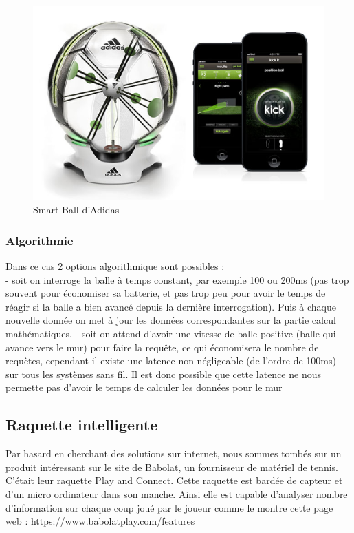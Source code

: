 \begin{figure}[h]
\begin{center}
\includegraphics[width=\textwidth]{ballefootintelligente.png}
\caption{Smart Ball d'Adidas}
\label{img:ballefootintelligente}
\end{center}
\end{figure}

\subsubsection{Algorithmie}

Dans ce cas 2 options algorithmique sont possibles : \\
- soit on interroge la balle à temps constant, par exemple 100 ou 200ms (pas trop souvent pour économiser sa batterie, et pas trop peu pour avoir le temps de réagir si la balle a bien avancé depuis la dernière interrogation). Puis à chaque nouvelle donnée on met à jour les données correspondantes sur la partie calcul mathématiques.
- soit on attend d'avoir une vitesse de balle positive (balle qui avance vers le mur) pour faire la requête, ce qui économisera le nombre de requètes, cependant il existe une latence non négligeable (de l'ordre de 100ms) sur tous les systèmes sans fil. Il est donc possible que cette latence ne nous permette pas d'avoir le temps de calculer les données pour le mur

\subsection{Raquette intelligente}

Par hasard en cherchant des solutions sur internet, nous sommes tombés sur un produit intéressant sur le site de Babolat, un fournisseur de matériel de tennis. C'était leur raquette Play and Connect. Cette raquette est bardée de capteur et d'un micro ordinateur dans son manche. Ainsi elle est capable d'analyser nombre d'information sur chaque coup joué par le joueur comme le montre cette page web : https://www.babolatplay.com/features \\

